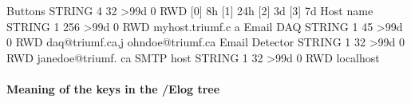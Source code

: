 \begin{DoxyCode}
                                        [13]            
                                        [14]            
                                        [15]            
                                        [16]            
                                        [17]            
                                        [18]            
                                        [19]  
Buttons                         STRING  4     32    >99d 0   RWD  
                                        [0]             8h
                                        [1]             24h
                                        [2]             3d
                                        [3]             7d
Host name                       STRING  1     256   >99d 0   RWD  myhost.triumf.c
      a
Email DAQ                       STRING  1     45    >99d 0   RWD  daq@triumf.ca,j
      ohndoe@triumf.ca
Email Detector                  STRING  1     32    >99d 0   RWD  janedoe@triumf.
      ca
SMTP host                       STRING  1     32    >99d 0   RWD  localhost
\end{DoxyCode}
\hypertarget{F_Elog_F_ODB_Elog_Tree_Keys}{}\paragraph{Meaning of the keys in the /Elog tree}\label{F_Elog_F_ODB_Elog_Tree_Keys}
